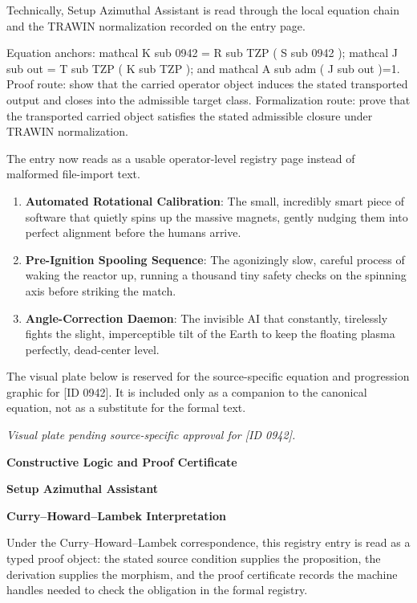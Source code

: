 Technically, Setup Azimuthal Assistant is read through the local equation chain and the TRAWIN normalization recorded on the entry page.

Equation anchors: mathcal K sub 0942 = R sub TZP ( S sub 0942 ); mathcal J sub out = T sub TZP ( K sub TZP ); and mathcal A sub adm ( J sub out )=1. Proof route: show that the carried operator object induces the stated transported output and closes into the admissible target class. Formalization route: prove that the transported carried object satisfies the stated admissible closure under TRAWIN normalization.

The entry now reads as a usable operator-level registry page instead of malformed file-import text.
\endgroup

\begin{enumerate}[leftmargin=1.6em,itemsep=6pt,topsep=4pt]
\item \textbf{Automated Rotational Calibration}: The small, incredibly smart piece of software that quietly spins up the massive magnets, gently nudging them into perfect alignment before the humans arrive.
\item \textbf{Pre-Ignition Spooling Sequence}: The agonizingly slow, careful process of waking the reactor up, running a thousand tiny safety checks on the spinning axis before striking the match.
\item \textbf{Angle-Correction Daemon}: The invisible AI that constantly, tirelessly fights the slight, imperceptible tilt of the Earth to keep the floating plasma perfectly, dead-center level.
\end{enumerate}

\begingroup\footnotesize\sloppy
The visual plate below is reserved for the source-specific equation and progression graphic for [ID 0942]. It is included only as a companion to the canonical equation, not as a substitute for the formal text.
\par\endgroup
\begingroup\footnotesize\itshape
Visual plate pending source-specific approval for [ID 0942].
\par\endgroup

\clearpage
\begingroup\tzpsupportsetup
\noindent\textbf{\fontsize{10.8pt}{12.8pt}\selectfont [ID 0942] Constructive Logic and Proof Certificate}\par
\noindent\textbf{\fontsize{10pt}{12pt}\selectfont Setup Azimuthal Assistant}\par
\vspace{0.45em}
\begingroup
\footnotesize
\setlength{\parskip}{0.22em}
\setlength{\parindent}{0pt}
\noindent\textbf{Curry--Howard--Lambek Interpretation}\par
Under the Curry--Howard--Lambek correspondence, this registry entry is read as a typed proof
object: the stated source condition supplies the proposition, the derivation supplies the
morphism, and the proof certificate records the machine handles needed to check the obligation
in the formal registry.

